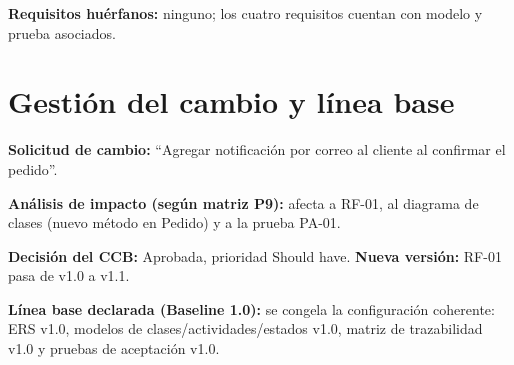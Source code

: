\documentclass[11pt]{article}
\begin{document}
\textbf{Requisitos huérfanos:} ninguno; los cuatro requisitos cuentan con modelo y prueba asociados.

\section{Gestión del cambio y línea base}

\textbf{Solicitud de cambio:} ``Agregar notificación por correo al cliente al confirmar el pedido''.

\textbf{Análisis de impacto (según matriz P9):} afecta a RF-01, al diagrama de clases (nuevo método en Pedido) y a la prueba PA-01.

\textbf{Decisión del CCB:} Aprobada, prioridad Should have. \quad \textbf{Nueva versión:} RF-01 pasa de v1.0 a v1.1.

\textbf{Línea base declarada (Baseline 1.0):} se congela la configuración coherente: ERS v1.0, modelos de clases/actividades/estados v1.0, matriz de trazabilidad v1.0 y pruebas de aceptación v1.0.
\end{document}
